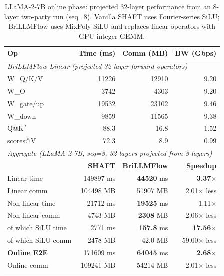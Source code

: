 \begin{table}[t]
\centering
\caption{LLaMA-2-7B online phase: projected 32-layer performance from an 8-layer two-party run (seq=8). Vanilla SHAFT uses Fourier-series SiLU; BriLLMFlow uses MixPoly SiLU and replaces linear operators with GPU integer GEMM.}
\label{tab:llama2_hybrid_comparison}
\setlength{\tabcolsep}{4pt}
\footnotesize
\begin{tabular}{lrrr}
\toprule
\textbf{Op} & \textbf{Time (ms)} & \textbf{Comm (MB)} & \textbf{BW (Gbps)} \\
\midrule
\multicolumn{4}{l}{\textit{BriLLMFlow Linear (projected 32-layer forward operators)}} \\
W\_Q/K/V & 11226 & 12910 & 9.20 \\
W\_O & 3742 & 4303 & 9.20 \\
W\_gate/up & 19532 & 23102 & 9.46 \\
W\_down & 9859 & 11565 & 9.38 \\
Q@K$^T$ & 88.3 & 16.8 & 1.52 \\
scores@V & 72.3 & 8.9 & 0.99 \\
\midrule
\multicolumn{4}{l}{\textit{Aggregate (LLaMA-2-7B, seq=8, 32 layers projected from 8 layers)}} \\
                       & \textbf{SHAFT} & \textbf{BriLLMFlow} & \textbf{Speedup} \\
Linear time            & 149897 ms & \textbf{44520} ms & \textbf{3.37}$\times$ \\
Linear comm            & 104498 MB & 51907 MB & 2.01$\times$ less \\
Non-linear time        & 21712 ms & \textbf{19525} ms & 1.11$\times$ \\
Non-linear comm        & 4743 MB & \textbf{2308} MB & 2.06$\times$ less \\
\quad of which SiLU time & 2771 ms & \textbf{157.8} ms & \textbf{17.56}$\times$ \\
\quad of which SiLU comm & 2478 MB & 42.0 MB & 59.00$\times$ less \\
\textbf{Online E2E}    & 171609 ms & \textbf{64045} ms & \textbf{2.68}$\times$ \\
Online comm            & 109241 MB & 54214 MB & 2.01$\times$ less \\
\bottomrule
\end{tabular}
\end{table}
